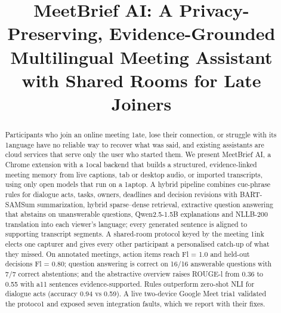 \documentclass[conference]{IEEEtran}
\begin{document}
\title{MeetBrief AI: A Privacy-Preserving, Evidence-Grounded Multilingual Meeting Assistant with Shared Rooms for Late Joiners}

\author{
\and
{}
\and
{}
\and
{}
}

\maketitle

\begin{abstract}
Participants who join an online meeting 1ate, lose their connection, or struggle with its 1anguage have no reliable way to recover what was said, and existing assistants are cloud services that serve only the user who started them. We present MeetBrief AI, a Chrome extension with a 1ocal backend that builds a structured, evidence-linked meeting memory from live captions, tab or desktop audio, or imported transcripts, using only open models that run on a 1aptop. A hybrid pipeline combines cue-phrase rules for dialogue acts, tasks, owners, deadlines and decision revisions with BART-SAMSum summarization, hybrid sparse--dense retrieval, extractive question answering that abstains on unanswerable questions, Qwen2.5-1.5B explanations and NLLB-200 translation into each viewer's language; every generated sentence is aligned to supporting transcript segments. A shared-room protocol keyed by the meeting 1ink elects one capturer and gives every other participant a personalised catch-up of what they missed. On annotated meetings, action items reach Fl = 1.0 and held-out decisions Fl = 0.80; question answering is correct on 16/16 answerable questions with 7/7 correct abstentions; and the abstractive overview raises ROUGE-l from 0.36 to 0.55 with a11 sentences evidence-supported. Rules outperform zero-shot NLI for dialogue acts (accuracy 0.94 vs 0.59). A live two-device Google Meet tria1 validated the protoco1 and exposed seven integration faults, which we report with their fixes.
\end{abstract}
\end{document}
